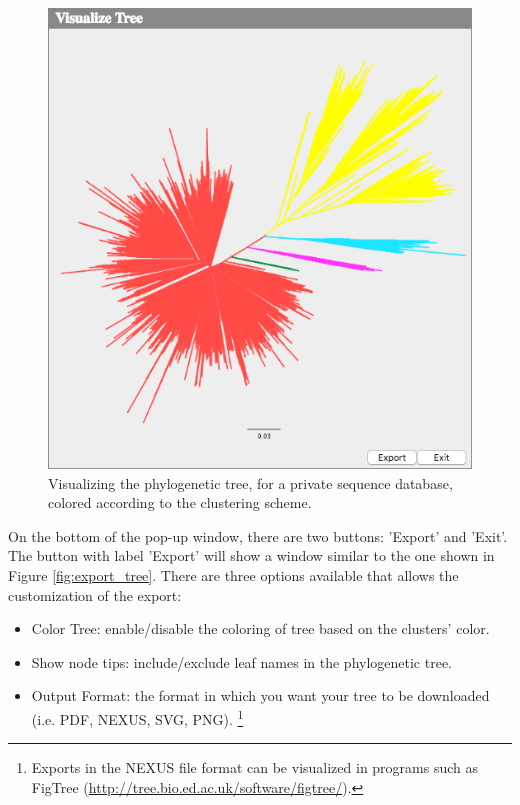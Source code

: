 \documentclass[a4paper, 11pt]{article} %
\begin{document}
\begin{figure}[H]
\centering
\includegraphics[scale=0.50]{images/view_tree.PNG}
\vspace{-0.25cm}
\caption{Visualizing the phylogenetic tree, for a private sequence database, colored according to the clustering scheme.}
\label{fig:view_tree}
\end{figure}


On the bottom of the pop-up window, there are two buttons: 'Export' and 'Exit'.
The button with label 'Export' will show a window similar to the one shown in Figure \ref{fig:export_tree}. There are three options available that allows the customization of the export:
\begin{itemize}
\item Color Tree: enable/disable the coloring of tree based on the clusters' color.
\item Show node tips: include/exclude leaf names in the phylogenetic tree.
\item Output Format: the format in which you want your tree to be downloaded (i.e. PDF, NEXUS, SVG, PNG). \footnote{Exports in the NEXUS file format can be visualized in programs such as FigTree (\url{http://tree.bio.ed.ac.uk/software/figtree/}).} 
\end{itemize}
\end{document}
